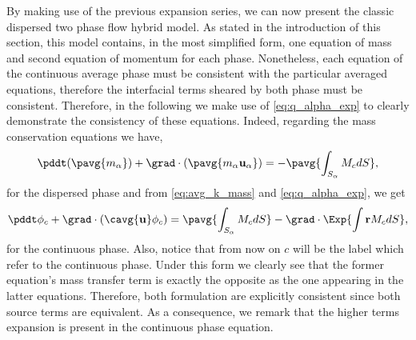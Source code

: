 By making use of the previous expansion series, we can now present the classic dispersed two phase flow hybrid model. 
As stated in the introduction of this section, this model contains, in the most simplified form, one equation of mass and second equation of momentum for each phase. 
Nonetheless, each equation of the continuous average phase must be consistent with the particular averaged equations, therefore the interfacial terms sheared by both phase must be consistent. 
Therefore, in the following we make use of \ref{eq:q_alpha_exp} to clearly demonstrate the consistency of these equations. 
Indeed, regarding the mass conservation equations we have,
\begin{equation}
    \pddt (\pavg{m_\alpha})
    + \grad \cdot \left(\pavg{m_\alpha\textbf{u}_\alpha}\right) 
    = 
    - \pavg{\int_{S_\alpha} M_c dS},
    \label{eq:classic_hybrid_mass_p}
\end{equation}
for the dispersed phase and from \ref{eq:avg_k_mass} and \ref{eq:q_alpha_exp}, we get
\begin{equation}
    \pddt \phi_c 
    + \grad \cdot \left(
        \cavg{\textbf{u}}\phi_c 
    \right) 
    =  \pavg{\int_{S_\alpha} M_c dS} - \grad \cdot \Exp{\int \textbf{r} M_c dS},
    \label{eq:classic_hybrid_mass_c}
\end{equation}
for the continuous phase. 
Also, notice that from now on $c$ will be the label which refer to the continuous phase.
Under this form we clearly see that the former equation's mass transfer term is exactly the opposite as the one appearing in the latter equations. 
Therefore, both formulation are explicitly consistent since both source terms are equivalent. 
As a consequence, we remark that the higher terms expansion is present in the continuous phase equation. 

